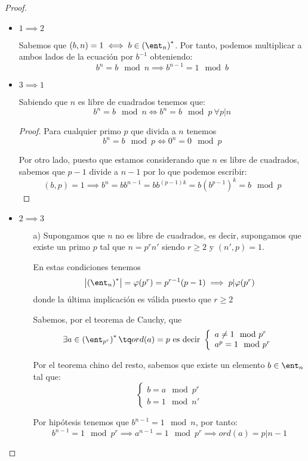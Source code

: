 \begin{proof}
\begin{itemize}
\item $1 \implies 2$

Sabemos que $(b,n)=1 \iff b \in\left(\ent_n\right)^*$. Por tanto, podemos multiplicar a ambos lados de la ecuación por $b^{-1}$ obteniendo:
\[b^n = b \mod n \implies b^{n-1}=1 \mod b\]

\item $3 \implies 1$

Sabiendo que $n$ es libre de cuadrados tenemos que:
\[b^n = b \mod n \iff b^n = b \mod p \ \forall p|n\]

\begin{proof}
Para cualquier primo $p$ que divida a $n$ tenemos
\[b^n = b \mod p \iff 0^n=0 \mod p \]

Por otro lado, puesto que estamos considerando que $n$ es libre de cuadrados, sabemos que $p-1$ divide a $n-1$ por lo que podemos escribir:
\[(b,p)=1 \implies b^n=bb^{n-1} = bb^{(p-1)k}=b\left(b^{p-1}\right)^k=b\mod p\]
\end{proof}

\item $2 \implies 3$

\begin{itemize}
\item[a)] Supongamos que $n$ no es libre de cuadrados, es decir, supongamos que existe un primo $p$ tal que $n=p^rn'$ siendo $r\geq2$ y $(n',p)=1$.

En estas condiciones tenemos
\[\left| \left(\ent_n\right)^*\right| = \varphi(p^r)=p^{r-1}(p-1) \implies p|\varphi(p^r)\]
donde la última implicación es válida puesto que $r\geq2$

Sabemos, por el teorema de Cauchy, que
\[\exists a \in \left(\ent_{p^r}\right)^* \tq ord(a)=p \text{ es decir } \left\{\begin{array}{l}a\neq 1 \mod p^r \\ a^p=1 \mod p^r \end{array}\right.\]

Por el teorema chino del resto, sabemos que existe un elemento $b \in \ent_n$ tal que:
\[\left\{\begin{array}{l}b=a\mod p^r \\ b=1 \mod n' \end{array}\right.\]

Por hipótesis tenemos que $b^{n-1}=1 \mod n$, por tanto:
\[b^{n-1} = 1 \mod p^r \implies a^{n-1} = 1 \mod p^r \implies ord(a) =p|n-1\]


\end{itemize}
\end{itemize}
\end{proof}
